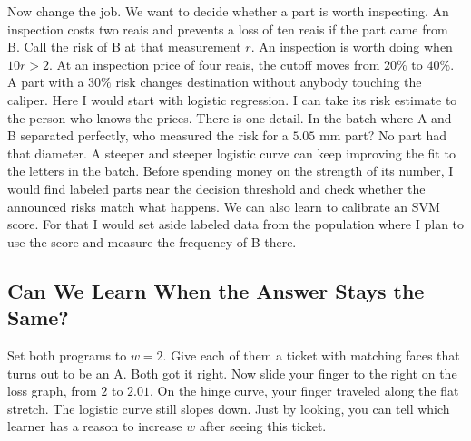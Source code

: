 \documentclass[12pt,oneside]{article}
\newcommand{\secao}[1]{\Needspace{5.2\baselineskip}\subsection*{#1}}
\newcommand{\bookanchor}[1]{\phantomsection\label{#1}}
\begin{document}
Now\bookanchor{topic-06-10} change the job. We want to decide whether a part is worth inspecting. An inspection costs two reais and prevents a loss of ten reais if the part came from B. Call the risk of B at that measurement $r$. An inspection is worth doing when $10r>2$. At an inspection price of four reais, the cutoff moves from $20\%$ to $40\%$. A part with a $30\%$ risk changes destination without anybody touching the caliper. Here I would start with logistic regression. I can take its risk estimate to the person who knows the prices. There is one detail. In the batch where A and B separated perfectly, who measured the risk for a $5.05$ mm part? No part had that diameter. A steeper and steeper logistic curve can keep improving the fit to the letters in the batch. Before spending money on the strength of its number, I would find labeled parts near the decision threshold and check whether the announced risks match what happens. We can also learn to calibrate an SVM score. For that I would set aside labeled data from the population where I plan to use the score and measure the frequency of B there.

\secao{Can We Learn When the Answer Stays the Same?}
Set both programs to $w=2$. Give each of them a ticket with matching faces that turns out to be an A. Both got it right. Now slide your finger to the right on the loss graph, from $2$ to $2.01$. On the hinge curve, your finger traveled along the flat stretch. The logistic curve still slopes down. Just by looking, you can tell which learner has a reason to increase $w$ after seeing this ticket.
\end{document}
